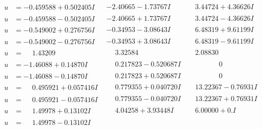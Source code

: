 \documentclass[1p]{elsarticle_modified}
\theoremstyle{definition}
\begin{document}
$$\begin{array}{c|c|c}
\begin{aligned}
u &= -0.459588 + 0.502405 I\end{aligned}
 & -2.40665 - 1.73767 I & \phantom{-}3.44724 + 4.36626 I \\ \hline\begin{aligned}
u &= -0.459588 - 0.502405 I\end{aligned}
 & -2.40665 + 1.73767 I & \phantom{-}3.44724 - 4.36626 I \\ \hline\begin{aligned}
u &= -0.549002 + 0.276756 I\end{aligned}
 & -0.34953 - 3.08643 I & \phantom{-}6.48319 + 9.61199 I \\ \hline\begin{aligned}
u &= -0.549002 - 0.276756 I\end{aligned}
 & -0.34953 + 3.08643 I & \phantom{-}6.48319 - 9.61199 I \\ \hline\begin{aligned}
u &= \phantom{-}1.43209\phantom{ +0.000000I}\end{aligned}
 & \phantom{-}3.32584\phantom{ +0.000000I} & \phantom{-}2.08830\phantom{ +0.000000I} \\ \hline\begin{aligned}
u &= -1.46088 + 0.14870 I\end{aligned}
 & \phantom{-}0.217823 - 0.520687 I & \phantom{-0.000000 } 0 \\ \hline\begin{aligned}
u &= -1.46088 - 0.14870 I\end{aligned}
 & \phantom{-}0.217823 + 0.520687 I & \phantom{-0.000000 } 0 \\ \hline\begin{aligned}
u &= \phantom{-}0.495921 + 0.057416 I\end{aligned}
 & \phantom{-}0.779355 + 0.040720 I & \phantom{-}13.22367 - 0.76931 I \\ \hline\begin{aligned}
u &= \phantom{-}0.495921 - 0.057416 I\end{aligned}
 & \phantom{-}0.779355 - 0.040720 I & \phantom{-}13.22367 + 0.76931 I \\ \hline\begin{aligned}
u &= \phantom{-}1.49978 + 0.13102 I\end{aligned}
 & \phantom{-}4.04258 + 3.93448 I & \phantom{-}6.00000 + 0. I\phantom{ +0.000000I} \\ \hline\begin{aligned}
u &= \phantom{-}1.49978 - 0.13102 I\end{aligned}

\end{array}$$
\end{document}
